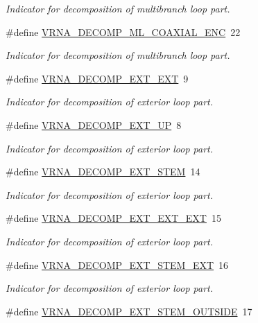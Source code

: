 \begin{DoxyCompactItemize}
\begin{DoxyCompactList}\small\item\em Indicator for decomposition of multibranch loop part. \end{DoxyCompactList}\item 
\#define \hyperlink{group__constraints_ga0224727f7b8ad2f23eb0a3fd28d8b3fb}{V\+R\+N\+A\+\_\+\+D\+E\+C\+O\+M\+P\+\_\+\+M\+L\+\_\+\+C\+O\+A\+X\+I\+A\+L\+\_\+\+E\+NC}~22
\begin{DoxyCompactList}\small\item\em Indicator for decomposition of multibranch loop part. \end{DoxyCompactList}\item 
\#define \hyperlink{group__constraints_ga437adf5115c1999304eff26b41e4c9b6}{V\+R\+N\+A\+\_\+\+D\+E\+C\+O\+M\+P\+\_\+\+E\+X\+T\+\_\+\+E\+XT}~9
\begin{DoxyCompactList}\small\item\em Indicator for decomposition of exterior loop part. \end{DoxyCompactList}\item 
\#define \hyperlink{group__constraints_gaff1ddaffe86d984623910b40cc8a8717}{V\+R\+N\+A\+\_\+\+D\+E\+C\+O\+M\+P\+\_\+\+E\+X\+T\+\_\+\+UP}~8
\begin{DoxyCompactList}\small\item\em Indicator for decomposition of exterior loop part. \end{DoxyCompactList}\item 
\#define \hyperlink{group__constraints_gae44b5ace0d9b4a29088069ecb4cec441}{V\+R\+N\+A\+\_\+\+D\+E\+C\+O\+M\+P\+\_\+\+E\+X\+T\+\_\+\+S\+T\+EM}~14
\begin{DoxyCompactList}\small\item\em Indicator for decomposition of exterior loop part. \end{DoxyCompactList}\item 
\#define \hyperlink{group__constraints_ga803bd818b3f4b2b0a4a5cfa2f7dc2045}{V\+R\+N\+A\+\_\+\+D\+E\+C\+O\+M\+P\+\_\+\+E\+X\+T\+\_\+\+E\+X\+T\+\_\+\+E\+XT}~15
\begin{DoxyCompactList}\small\item\em Indicator for decomposition of exterior loop part. \end{DoxyCompactList}\item 
\#define \hyperlink{group__constraints_gabb09c5b78b75a44502fc77b950125c1e}{V\+R\+N\+A\+\_\+\+D\+E\+C\+O\+M\+P\+\_\+\+E\+X\+T\+\_\+\+S\+T\+E\+M\+\_\+\+E\+XT}~16
\begin{DoxyCompactList}\small\item\em Indicator for decomposition of exterior loop part. \end{DoxyCompactList}\item 
\#define \hyperlink{group__constraints_gae7554cd3ff089360c02e4920229e221c}{V\+R\+N\+A\+\_\+\+D\+E\+C\+O\+M\+P\+\_\+\+E\+X\+T\+\_\+\+S\+T\+E\+M\+\_\+\+O\+U\+T\+S\+I\+DE}~17\hypertarget{group__constraints_gae7554cd3ff089360c02e4920229e221c}{}\label{group__constraints_gae7554cd3ff089360c02e4920229e221c}


\end{DoxyCompactItemize}
